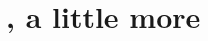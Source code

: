 \documentclass[10pt]{article}
\newcommand\lLine{{\color{gray} \noindent\rule{\textwidth}{0.4pt}}}
\begin{document}
\vfill

\begin{comment}
  In summary, constraint on answers to \qWhy{} in terms of answers to \qHow{} does not hold.

  In short, answering \emph{how} details a particular event.

  Yet, when asking about \emph{why} some thing we're often interested in classifying a particular event as an instance of a general phenomenon.

  \emph{Why} was the agent's reasoning an instance of applying their understanding of Sudoku, rather than something else?
  E.g., guessing randomly.

  To do this, one ends up citing the way things happen in other cases.

  In very short, a single instance of reasoning is an instance of a general type of reasoning \emph{only if} the particular instance may be adapted to a different instance of the type, resources permitting.

  So, that a particular \fofr{} answers \qWhy{} (sometimes) also entails various other \fofr{1} answer \qWhy{}.

  \lLine{}
\end{comment}

\begin{comment}
  Perhaps this result is due to the level of generality at which \qWhy{} and \qHow{} are asked?

  I don't think this is right.

  For example, suppose we have very detailed picture of what happens when someone is doing a Sudoku puzzle.
  And, there's some neural activity which is only activated when the agent is doing Sudoku puzzles.
  Sure, we have plausibly have an answer to both \qWhy{} which at first glance only looks at what happened (in line with \issueInclusion{}).
  However, what makes it the case that the neural activity is that of solving Sudoku puzzles?
  Well, plausibly due to the same neural activity in other events.
\end{comment}

\vfill

\newpage

\section{, a little more}
\end{document}
